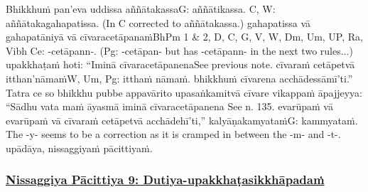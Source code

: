 Bhikkhuṁ pan'eva uddissa aññātakassa\makeatletter\hyperlink{endnote-appendix}\makeatother G: aññātikassa. C, W: aññātakagahapatissa. (In C corrected to aññātakassa.) gahapatissa vā gahapatāniyā vā cīvaracetāpanaṁ\makeatletter\hyperlink{endnote-appendix}\makeatother BhPm 1 & 2, D, C, G, V, W, Dm, Um, UP, Ra, Vibh Ce: -cetāpann-. (Pg: -cetāpan- but has -cetāpann- in the next two rules...) upakkhaṭaṁ hoti: ``Iminā cīvaracetāpanena\makeatletter\hyperlink{endnote-appendix}\makeatother See previous note.  cīvaraṁ cetāpetvā itthan'nāmaṁ\makeatletter\hyperlink{endnote-appendix}\makeatother W, Um, Pg: itthaṁ nāmaṁ. bhikkhuṁ cīvarena acchādessāmī'ti.'' Tatra ce so bhikkhu pubbe appavārito upasaṅkamitvā cīvare vikappaṁ āpajjeyya: ``Sādhu vata maṁ āyasmā iminā cīvaracetāpanena\makeatletter\hyperlink{endnote-appendix} See n. 135. evarūpaṁ vā evarūpaṁ vā cīvaraṁ cetāpetvā acchādehī'ti,'' kalyāṇakamyataṁ\makeatletter\hyperlink{endnote-appendix}\makeatother G: kammyataṁ. The -y- seems to be a correction as it is cramped in between the -m- and -t-. upādāya, nissaggiyaṁ pācittiyaṁ.



\subsubsection*{\hyperref[forf-exp9]{Nissaggiya Pācittiya 9: Dutiya-upakkhaṭasikkhāpadaṁ}}
\label{np9}

